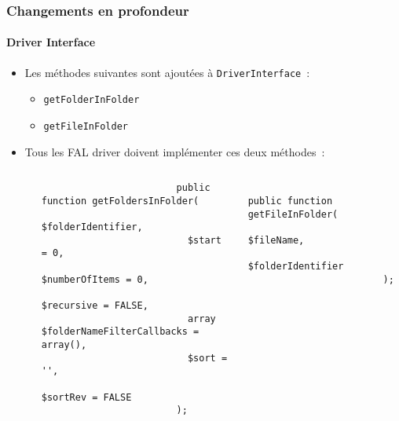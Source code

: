 \begin{frame}[fragile]
	\frametitle{Changements en profondeur}
	\framesubtitle{Driver Interface}

	\lstset{basicstyle=\tiny\ttfamily}

	\begin{itemize}

		\item Les méthodes suivantes sont ajoutées à  \texttt{DriverInterface}~:

			\begin{itemize}
				\item \texttt{getFolderInFolder}
				\item \texttt{getFileInFolder}
			\end{itemize}

		\item Tous les FAL driver doivent implémenter ces deux méthodes~:

			\begin{columns}[T]
				\begin{column}{.07\textwidth}
                \end{column}
				\begin{column}{.465\textwidth}

					\begin{lstlisting}
						public function getFoldersInFolder(
						  $folderIdentifier,
						  $start = 0,
						  $numberOfItems = 0,
						  $recursive = FALSE,
						  array $folderNameFilterCallbacks = array(),
						  $sort = '',
						  $sortRev = FALSE
						);
					\end{lstlisting}

                \end{column}
				\begin{column}{.465\textwidth}

					\begin{lstlisting}
						public function getFileInFolder(
						  $fileName,
						  $folderIdentifier
						);
					\end{lstlisting}

				\end{column}
			\end{columns}

	\end{itemize}

	\breakingchange

\end{frame}


